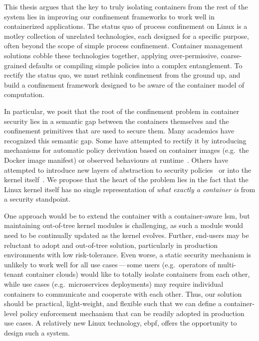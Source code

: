 This thesis argues that the key to truly isolating containers from the rest of the system
lies in improving our confinement frameworks to work well in containerized applications.
The status quo of process confinement on Linux is a motley collection of unrelated
technologies, each designed for a specific purpose, often beyond the scope of simple
process confinement. Container management solutions cobble these technologies together,
applying over-permissive, coarse-grained defaults or compiling simple policies into
a complex entanglement. To rectify the status quo, we must rethink confinement from the
ground up, and build a confinement framework designed to be aware of the container model
of computation.

In particular, we posit that the root of the confinement problem in container security
lies in a semantic gap between the containers themselves and the confinement primitives
that are used to secure them. Many academics have recognized this semantic gap. Some have
attempted to rectify it by introducing mechanisms for automatic policy derivation based on
container images (e.g.~the Docker image manifest) or observed behaviours at
runtime~. Others have attempted to introduce new layers of
abstraction to security policies~ or into the kernel
itself~.  We
propose that the heart of the problem lies in the fact that the Linux kernel itself has no
single representation of \textit{what exactly a container is} from a security standpoint.

One approach would be to extend the container with a container-aware \gls{lsm}, but maintaining
out-of-tree kernel modules is challenging, as such a module would need to be continually
updated as the kernel evolves. Further, end-users may be reluctant to adopt and
out-of-tree solution, particularly in production environments with low risk-tolerance.
Even worse, a static security mechanism is unlikely to work well for all use
cases\,---\,some users (e.g.~operators of multi-tenant container clouds) would like to
totally isolate containers from each other, while use cases (e.g.~microservices
deployments) may require individual containers to communicate and cooperate with each
other. Thus, our solution should be practical, light-weight, and flexible such that we can
define a container-level policy enforcement mechanism that can be readily adopted in
production use cases. A relatively new Linux technology, \gls{ebpf}, offers the opportunity to design such a system.

